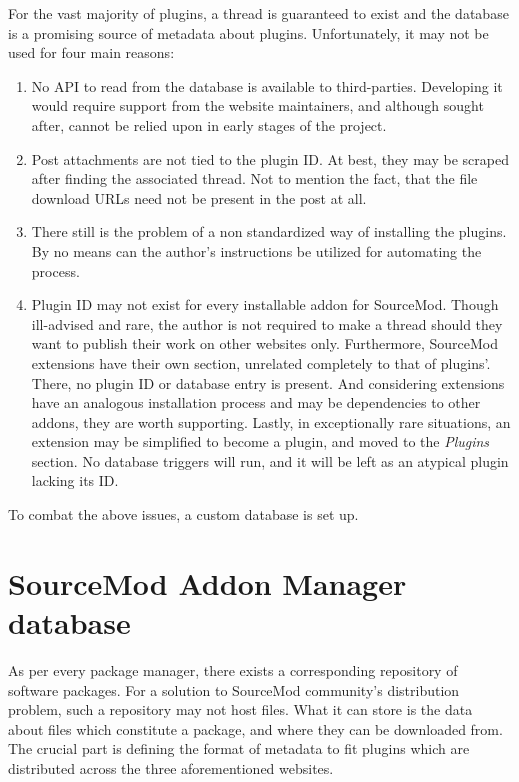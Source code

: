 For the vast majority of plugins, a thread is guaranteed to exist and the database is a promising source of metadata about plugins.
Unfortunately, it may not be used for four main reasons:
\begin{enumerate}
\item
No API to read from the database is available to third-parties.
Developing it would require support from the website maintainers, and although sought after, cannot be relied upon in early stages of the project.
\item
Post attachments are not tied to the plugin ID\@.
At best, they may be scraped after finding the associated thread.
Not to mention the fact, that the file download URLs need not be present in the post at all.
\item
There still is the problem of a non standardized way of installing the plugins.
By no means can the author's instructions be utilized for automating the process.
\item
Plugin ID may not exist for every installable addon for SourceMod.
Though ill-advised and rare, the author is not required to make a thread should they want to publish their work on other websites only.
Furthermore, SourceMod extensions have their own section, unrelated completely to that of plugins'.
There, no plugin ID or database entry is present.
And considering extensions have an analogous installation process and may be dependencies to other addons, they are worth supporting.
Lastly, in exceptionally rare situations, an extension may be simplified to become a plugin, and moved to the \textit{Plugins} section.
No database triggers will run, and it will be left as an atypical plugin lacking its ID.
\end{enumerate}

To combat the above issues, a custom database is set up.

\section{SourceMod Addon Manager database}
\label{smamdb-main}

As per every package manager, there exists a corresponding repository of software packages.
For a solution to SourceMod community's distribution problem, such a repository may not host files.
What it can store is the data about files which constitute a package, and where they can be downloaded from.
The crucial part is defining the format of metadata to fit plugins which are distributed across the three aforementioned websites.

